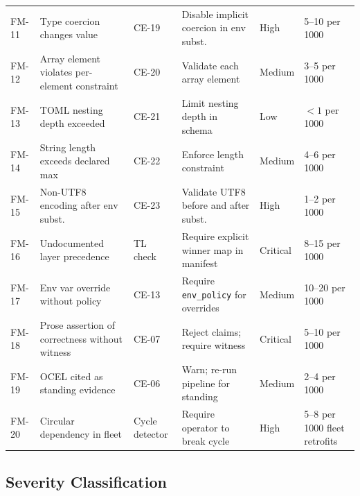 \documentclass[12pt, letterpaper]{report}
\theoremstyle{plain}
\theoremstyle{definition}
\theoremstyle{remark}
\begin{document}
\begin{longtable}{@{}p{1.5cm}p{2.0cm}p{2.2cm}p{2.0cm}p{2.0cm}p{2.2cm}@{}}
FM-11 & Type coercion changes value & CE-19 & Disable implicit coercion in env subst. & High & 5--10 per 1000 \\

FM-12 & Array element violates per-element constraint & CE-20 & Validate each array element & Medium & 3--5 per 1000 \\

FM-13 & TOML nesting depth exceeded & CE-21 & Limit nesting depth in schema & Low & $< 1$ per 1000 \\

FM-14 & String length exceeds declared max & CE-22 & Enforce length constraint & Medium & 4--6 per 1000 \\

FM-15 & Non-UTF8 encoding after env subst. & CE-23 & Validate UTF8 before and after subst. & High & 1--2 per 1000 \\

FM-16 & Undocumented layer precedence & TL check & Require explicit winner map in manifest & Critical & 8--15 per 1000 \\

FM-17 & Env var override without policy & CE-13 & Require \texttt{env\_policy} for overrides & Medium & 10--20 per 1000 \\

FM-18 & Prose assertion of correctness without witness & CE-07 & Reject claims; require witness & Critical & 5--10 per 1000 \\

FM-19 & OCEL cited as standing evidence & CE-06 & Warn; re-run pipeline for standing & Medium & 2--4 per 1000 \\

FM-20 & Circular dependency in fleet & Cycle detector & Require operator to break cycle & High & 5--8 per 1000 fleet retrofits \\

\bottomrule
\end{longtable}

\subsection{Severity Classification}
\end{document}
